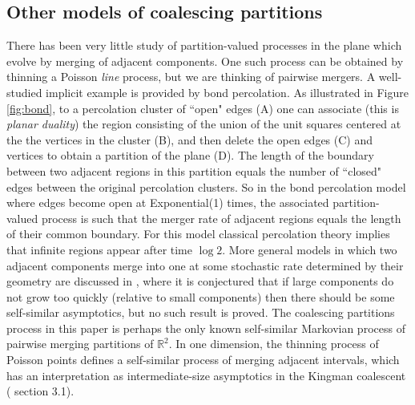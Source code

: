 \documentclass[12pt]{article}
\newcommand{\Reals}{{\mathbb{R}}}
\begin{document}
 \subsection{Other models of coalescing partitions}
 \label{sec:other_coal}
 There has been very little study of partition-valued processes in the plane which evolve by merging of adjacent components.
 One such process can be obtained by thinning a Poisson {\em line} process, but we are thinking of pairwise mergers. 
A well-studied implicit example is provided by bond percolation.
As illustrated in Figure \ref{fig:bond}, 
to a percolation cluster of ``open" edges  (A) one can associate (this is {\em planar duality}) the region consisting of the union of the unit squares centered at the the vertices in the cluster (B), 
and then delete the open edges (C) and vertices to obtain a partition of the plane (D).  
The length of the boundary between two adjacent regions in this partition equals the number of ``closed"  edges between the original percolation clusters. 
So in the bond percolation model where edges become open at Exponential(1) times, 
the associated partition-valued process is such that the merger rate of adjacent regions equals the length of their common boundary. 
For this model classical percolation theory \cite{grimmett} implies that infinite regions appear after time $\log 2$.
 More general models in which two adjacent components merge into one at some stochastic rate determined by their geometry
are discussed in \cite{me-empires}, where it is conjectured that if large components do not grow too quickly (relative to small components) then there should be some self-similar
asymptotics, but no such result is proved.  
The coalescing partitions process in this paper is perhaps the only known self-similar Markovian process of pairwise merging partitions of $\Reals^2$.
In one dimension, the thinning process of Poisson points defines a self-similar process of merging adjacent intervals, which has an interpretation as intermediate-size 
asymptotics in the Kingman coalescent (\cite{me-coal} section 3.1).


\newpage

\setlength{\unitlength}{0.125in}
\end{document}
